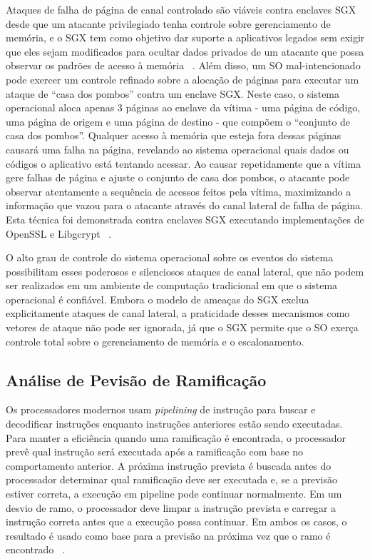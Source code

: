 \documentclass[review]{elsarticle}
\begin{document}
Ataques de falha de página de canal controlado são viáveis contra enclaves SGX desde que um atacante privilegiado tenha controle sobre gerenciamento de memória, e o SGX tem como objetivo dar suporte a aplicativos legados sem exigir que eles sejam modificados para ocultar dados privados de um atacante que possa observar os padrões de acesso à memória ~\cite{xu_controlled-channel_2015}. Além disso, um SO mal-intencionado pode exercer um controle refinado sobre a alocação de páginas para executar um ataque de ``casa dos pombos'' contra um enclave SGX. Neste caso, o sistema operacional aloca apenas 3 páginas ao enclave da vítima - uma página de código, uma página de origem e uma página de destino - que compõem o ``conjunto de casa dos pombos''. Qualquer acesso à memória que esteja fora dessas páginas causará uma falha na página, revelando ao sistema operacional quais dados ou códigos o aplicativo está tentando acessar. Ao causar repetidamente que a vítima gere falhas de página e ajuste o conjunto de casa dos pombos, o atacante pode observar atentamente a sequência de acessos feitos pela vítima, maximizando a informação que vazou para o atacante através do canal lateral de falha de página. Esta técnica foi demonstrada contra enclaves SGX executando implementações de OpenSSL e Libgcrypt ~\cite{shinde_preventing_2015}.

O alto grau de controle do sistema operacional sobre os eventos do sistema possibilitam esses poderosos e silenciosos ataques de canal lateral, que não podem ser realizados em um ambiente de computação tradicional em que o sistema operacional é confiável. Embora o modelo de ameaças do SGX exclua explicitamente ataques de canal lateral, a praticidade desses mecanismos como vetores de ataque não pode ser ignorada, já que o SGX permite que o SO exerça controle total sobre o gerenciamento de memória e o escalonamento.

\subsection{Análise de Pevisão de Ramificação}

Os processadores modernos usam \emph{pipelining} de instrução para buscar e decodificar instruções enquanto instruções anteriores estão sendo executadas. Para manter a eficiência quando uma ramificação é encontrada, o processador prevê qual instrução será executada após a ramificação com base no comportamento anterior. A próxima instrução prevista é buscada antes do processador determinar qual ramificação deve ser executada e, se a previsão estiver correta, a execução em pipeline pode continuar normalmente. Em um desvio de ramo, o processador deve limpar a instrução prevista e carregar a instrução correta antes que a execução possa continuar. Em ambos os casos, o resultado é usado como base para a previsão na próxima vez que o ramo é encontrado ~\cite{aciicmez_power_2007, lee_inferring_2017}.
\end{document}
